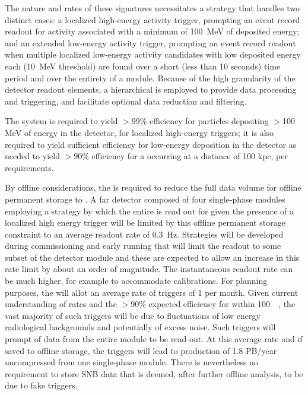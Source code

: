 The nature and rates of these signatures necessitates a  strategy that handles two
distinct cases: a localized high-energy activity trigger, prompting an event record readout for
activity associated with a minimum of \SI{100}{MeV} of deposited energy; and an extended low-energy
activity trigger, prompting an event record readout when multiple localized low-energy activity
candidates with low deposited energy each (\SI{10}{MeV} threshold) are found over a short (less than
10 seconds) time period and over the entirety of a \nominalmodsize  module. Because of the high
granularity of the detector readout elements, a hierarchical  is employed to
provide data processing and triggering, and facilitate optional data reduction and filtering. 

The   system is required to yield $>$99\% efficiency for particles depositing $>$100 MeV
of energy in the detector, for localized high-energy triggers; it is also required to yield
sufficient efficiency for low-energy deposition in the detector as
needed to yield $>$90\% efficiency for a  occurring at a
distance of 100 kpc, per  requirements.

By offline considerations, the  is required to reduce the
full  data volume for offline permanent storage to  \offsitepbpy.
A far detector composed of four single-phase modules employing a
strategy by which the entire  is read out for \spreadout
given the presence of a localized high energy trigger will be limited
by this offline permanent storage constraint to an average readout rate of \SI{0.3}{\hertz}. 
Strategies will be developed during commissioning and early running that will limit the readout to some subset of the detector module and these are expected to allow an increase in this rate limit by about an order of magnitude.
The instantaneous readout rate can be much higher, for example to accommodate calibrations.
For planning purposes, the  will allot an average rate of  triggers of 1 per month.
Given current understanding of  rates and the $>$90\% expected efficiency for  within \SI{100}{\kilo\parsec}, the vast majority of such triggers will be due to fluctuations of low energy radiological backgrounds and potentially of excess noise.
Such triggers will prompt \snbtime of data from the entire module to be read out.
At this average rate and if saved to offline storage, the 
triggers will lead to production of 1.8 PB/year uncompressed from one
single-phase module. There is nevertheless no requirement to store SNB
data that is deemed, after further offline analysis, to be due to fake triggers.

